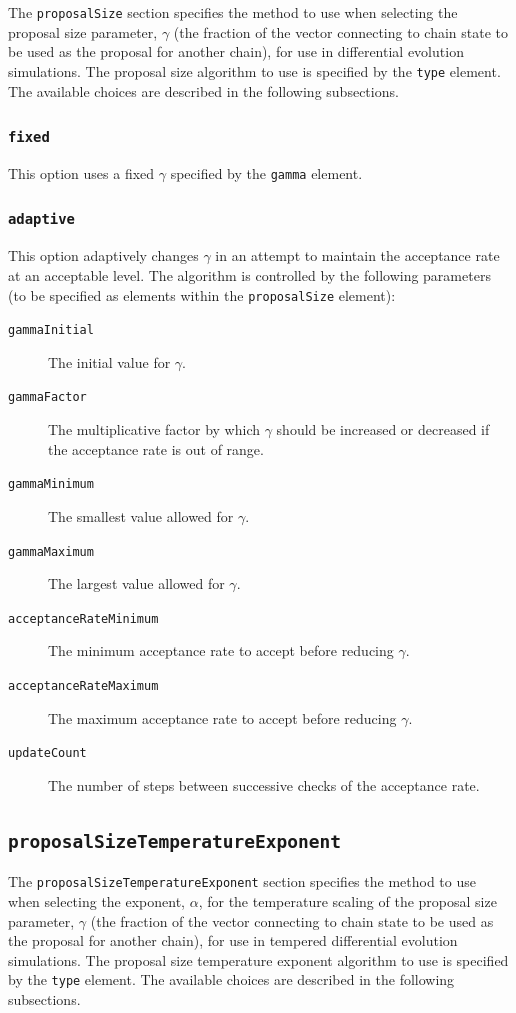 The {\tt proposalSize} section specifies the method to use when selecting the proposal size parameter, $\gamma$ (the fraction of the vector connecting to chain state to be used as the proposal for another chain), for use in differential evolution simulations. The proposal size algorithm to use is specified by the {\tt type} element. The available choices are described in the following subsections.

\subsubsection{{\tt fixed}}

This option uses a fixed $\gamma$ specified by the {\tt gamma} element.

\subsubsection{{\tt adaptive}}

This option adaptively changes $\gamma$ in an attempt to maintain the acceptance rate at an acceptable level. The algorithm is controlled by the following parameters (to be specified as elements within the {\tt proposalSize} element):
\begin{description}
\item[{\tt gammaInitial}] The initial value for $\gamma$.
\item[{\tt gammaFactor}] The multiplicative factor by which $\gamma$ should be increased or decreased if the acceptance rate is out of range.
\item[{\tt gammaMinimum}] The smallest value allowed for $\gamma$.
\item[{\tt gammaMaximum}] The largest value allowed for $\gamma$.
\item[{\tt acceptanceRateMinimum}] The minimum acceptance rate to accept before reducing $\gamma$.
\item[{\tt acceptanceRateMaximum}] The maximum acceptance rate to accept before reducing $\gamma$.
\item[{\tt updateCount}] The number of steps between successive checks of the acceptance rate.
\end{description}

\subsection{{\tt proposalSizeTemperatureExponent}}

The {\tt proposalSizeTemperatureExponent} section specifies the method to use when selecting the exponent, $\alpha$, for the temperature scaling of the proposal size parameter, $\gamma$ (the fraction of the vector connecting to chain state to be used as the proposal for another chain), for use in tempered differential evolution simulations. The proposal size temperature exponent algorithm to use is specified by the {\tt type} element. The available choices are described in the following subsections.

